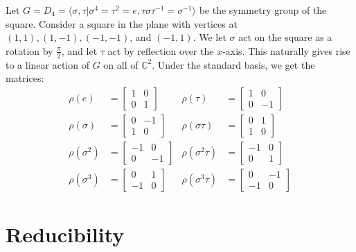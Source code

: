 \begin{frame}[plain]
\begin{example}
Let $G = D_4 = \langle \sigma, \tau |  \sigma^4 = \tau^2 = e, \tau \sigma \tau^{-1} = \sigma^{-1} \rangle$ be the symmetry group of the square.  \pause Consider a square in the plane with vertices at $(1,1), (1,-1), (-1, -1)$, and $(-1, 1)$.  \pause We let $\sigma$ act on the square as a rotation by $\frac{\pi}{2}$, and let $\tau$ act by reflection over the $x$-axis.  This naturally gives rise to a linear action of $G$ on all of $\mathbb{C}^2$.  \pause  Under the standard basis, we get the matrices:
\begin{align*}
\rho( e) &= \begin{bmatrix} 1 & 0 \\ 0 & 1\end{bmatrix}  &\rho (\tau) &= \begin{bmatrix} 1 & 0 \\ 0 & -1\end{bmatrix} \\
\rho (\sigma) &= \begin{bmatrix} 0 & -1 \\ 1 & 0  \end{bmatrix} & \rho (\sigma \tau ) &= \begin{bmatrix} 0 & 1 \\ 1 & 0\end{bmatrix} \\
\rho (\sigma^2) &= \begin{bmatrix} -1 & 0 \\ 0 & -1  \end{bmatrix} & \rho (\sigma^2 \tau) &= \begin{bmatrix} -1 & 0 \\ 0 & 1\end{bmatrix} \\
\rho (\sigma^3) &= \begin{bmatrix} 0 & 1 \\ -1 & 0  \end{bmatrix} & \rho (\sigma^3 \tau) &= \begin{bmatrix} 0 & -1 \\ -1 & 0\end{bmatrix}
\end{align*}
\end{example}
\end{frame}

\section{Reducibility}
